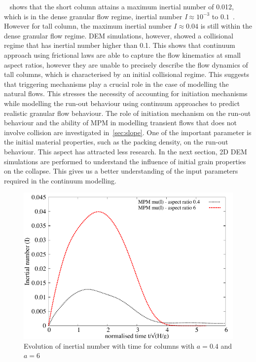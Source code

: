 ~ shows that the short column attains a maximum inertial 
number of 0.012, which is in the dense granular flow regime, inertial number 
\textit{I}$\approx10^{-3}$ to $0.1$~\citep{DaCruz2005}. However for tall 
column, the maximum inertial number $I\approx0.04$ is still within the 
dense granular flow regime. DEM simulations, however, showed a collisional 
regime that has inertial number higher than 0.1. This shows that continuum 
approach using frictional laws are able to capture the flow kinematics at small 
aspect ratios, however they are unable to precisely describe the flow dynamics 
of tall columns, which is characterised by an initial collisional regime. This 
suggests that triggering mechanisms play a crucial role in the case of 
modelling the natural flows. This stresses the necessity of accounting for 
initiation mechanisms while modelling the run-out behaviour 
using continuum approaches to predict realistic granular flow behaviour. The 
role of initiation mechanism on the run-out behaviour and the ability of MPM in 
modelling transient flows that does not involve collision are investigated 
in~\cref{sec:slope}. One of the important parameter is the initial material 
properties, such as the packing density, on the run-out behaviour. This aspect 
has attracted less research. In the next section, 2D DEM simulations are 
performed to understand the influence of initial grain properties on the 
collapse. This gives us a better understanding of the input parameters required 
in the continuum modelling. 

\begin{figure}[tbhp]
\centering
\includegraphics[width=\textwidth]{muI}
\caption{Evolution of inertial number with time for columns with $a=0.4$ and 
$a=6$}
\label{fig:muI}
\end{figure}

